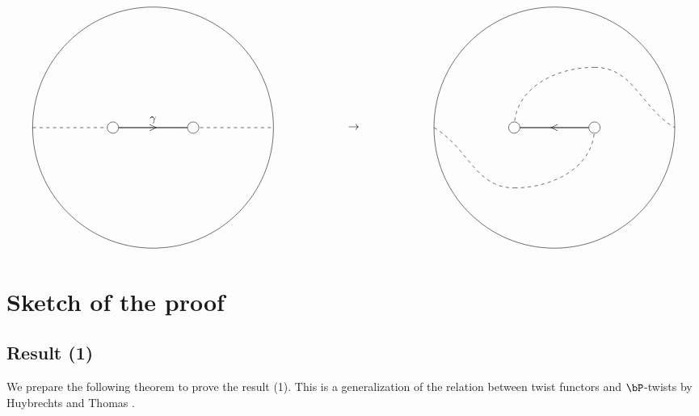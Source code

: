 \documentclass[a0,landscape]{a0poster}
\theoremstyle{plain}
\theoremstyle{definition}
\begin{document}
\begin{multicols}{3}
    \begin{center}
        \centering
        \begin{displaymath}
            \begin{tikzpicture}[scale=2.5]
                \draw (0, 1.5) circle[radius=1.5];
                \draw[thick] (-0.5, 1.5)--(0.5, 1.5);
                \draw(0, 1.5) node{$>$};
                \draw[dashed] (-1.5, 1.5)--(-0.5, 1.5);
                \draw[dashed] (0.5, 1.5)--(1.5, 1.5);

                \foreach \u in {-0.5, 0.5}
                    {
                        \filldraw[white] (\u, 1.5) circle (2pt);
                        \draw[black] (\u, 1.5) circle (2pt);
                    }
                \draw(0, 1.5) node[above]{$\gamma$};

                \draw(2.5, 1.5) node{$\rightarrow$};

                \draw (0+5, 1.5) circle[radius=1.5];
                \draw[thick] (-0.5+5, 1.5)--(0.5+5, 1.5);
                \draw(5, 1.5) node{$<$};


                \draw[dashed](-1.5+5, 1.5) to[out=-30,in=180](-0.5+5, 0.75);
                \draw[dashed](-0.5+5, 0.75) to[out=0,in=-90](0.5+5, 1.5);

                \draw[dashed](-0.5+5, 1.5) to[out=90,in=180](0.5+5, 2.25);
                \draw[dashed](0.5+5, 2.25) to[out=0,in=150](1.5+5, 1.5);


                \foreach \u in {-0.5, 0.5}
                    {
                        \filldraw[white] (\u+5, 1.5) circle (2pt);
                        \draw[black] (\u+5, 1.5) circle (2pt);
                    }
            \end{tikzpicture}
        \end{displaymath}
    \end{center}


    \color{NavyBlue}\section{Sketch of the proof}

    \color{DarkSlateGray}
    \subsection{Result (1)}
    We prepare the following theorem to prove the result (1). This is a generalization of the relation between twist functors and $\bP$-twists by Huybrechts and Thomas \cite{MR2200048}.



\end{multicols}
\end{document}
